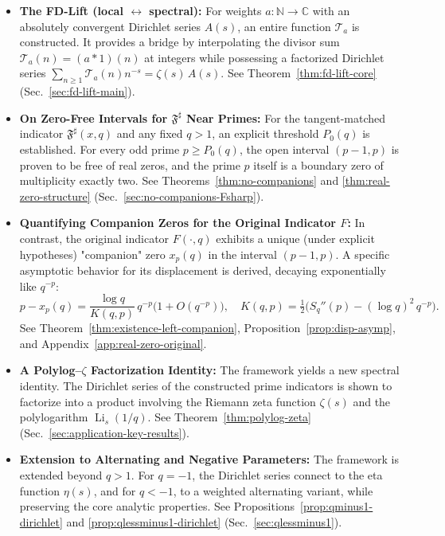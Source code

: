 \documentclass[11pt,a4paper]{amsart}
\newcommand{\F}{F}
\newcommand{\Fbase}{\mathfrak F}
\newcommand{\Fsharp}{\Fbase^{\sharp}}
\theoremstyle{plain}
\theoremstyle{definition}
\theoremstyle{remark}
\begin{document}
\begin{itemize}
    \item \textbf{The FD-Lift (local $\leftrightarrow$ spectral):} For weights $a:\mathbb N\to\mathbb C$ with an absolutely convergent Dirichlet series $A(s)$, an entire function $\mathcal T_a$ is constructed. It provides a bridge by interpolating the divisor sum $\mathcal T_a(n)=(a*1)(n)$ at integers while possessing a factorized Dirichlet series $\sum_{n\ge1}\mathcal T_a(n)n^{-s}=\zeta(s)\,A(s)$. See Theorem~\ref{thm:fd-lift-core} (Sec.~\ref{sec:fd-lift-main}).

    \item \textbf{On Zero-Free Intervals for $\Fsharp$ Near Primes:} For the tangent-matched indicator $\Fsharp(x,q)$ and any fixed $q>1$, an explicit threshold $P_0(q)$ is established. For every odd prime $p\ge P_0(q)$, the open interval $(p-1,p)$ is proven to be free of real zeros, and the prime $p$ itself is a boundary zero of multiplicity exactly two. See Theorems~\ref{thm:no-companions} and \ref{thm:real-zero-structure} (Sec.~\ref{sec:no-companions-Fsharp}).

    \item \textbf{Quantifying Companion Zeros for the Original Indicator $\F$:} In contrast, the original indicator $\F(\cdot,q)$ exhibits a unique (under explicit hypotheses) "companion" zero $x_p(q)$ in the interval $(p-1,p)$. A specific asymptotic behavior for its displacement is derived, decaying exponentially like $q^{-p}$:
    \[
    p-x_p(q)=\frac{\log q}{K(q,p)}\,q^{-p}\bigl(1+O(q^{-p})\bigr),
    \quad
    K(q,p)=\tfrac12\Big(S_q''(p)-(\log q)^2\,q^{-p}\Big).
    \]
    See Theorem~\ref{thm:existence-left-companion}, Proposition~\ref{prop:disp-asymp}, and Appendix~\ref{app:real-zero-original}.

    \item \textbf{A Polylog–$\zeta$ Factorization Identity:} The framework yields a new spectral identity. The Dirichlet series of the constructed prime indicators is shown to factorize into a product involving the Riemann zeta function $\zeta(s)$ and the polylogarithm $\operatorname{Li}_s(1/q)$.
    See Theorem~\ref{thm:polylog-zeta} (Sec.~\ref{sec:application-key-results}).

    \item \textbf{Extension to Alternating and Negative Parameters:} The framework is extended beyond $q>1$. For $q=-1$, the Dirichlet series connect to the eta function $\eta(s)$, and for $q<-1$, to a weighted alternating variant, while preserving the core analytic properties. See Propositions~\ref{prop:qminus1-dirichlet} and \ref{prop:qlessminus1-dirichlet} (Sec.~\ref{sec:qlessminus1}).
\end{itemize}
\end{document}
